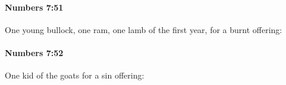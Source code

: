 		\paragraph{Numbers 7:51} %
			\label{NUMBERS-7-51}

			One young bullock, one ram, one lamb of the first year, for a burnt offering:


		\paragraph{Numbers 7:52} %
			\label{NUMBERS-7-52}

			One kid of the goats for a sin offering:


